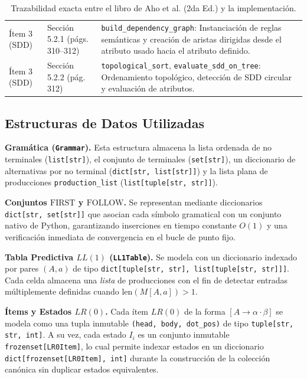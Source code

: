 \documentclass[11pt,a4paper]{article}
\begin{document}
\begin{table}[htbp]
\begin{tabular}{@{}>{\raggedright\arraybackslash}p{1.8cm}>{\raggedright\arraybackslash}p{4.3cm}>{\raggedright\arraybackslash}p{9.2cm}@{}}
\addlinespace[3pt]
\'Item 3 (SDD) & Secci\'on 5.2.1 (p\'ags. 310--312) & \texttt{build\_dependency\_graph}: Instanciaci\'on de reglas sem\'anticas y creaci\'on de aristas dirigidas desde el atributo usado hacia el atributo definido. \\
\addlinespace[3pt]
\'Item 3 (SDD) & Secci\'on 5.2.2 (p\'ag. 312) & \texttt{topological\_sort}, \texttt{evaluate\_sdd\_on\_tree}: Ordenamiento topol\'ogico, detecci\'on de SDD circular y evaluaci\'on de atributos. \\
\bottomrule
\end{tabular}
\caption{Trazabilidad exacta entre el libro de Aho et al. (2da Ed.) y la implementaci\'on.}
\label{tab:trazabilidad}
\end{table}

\subsection{Estructuras de Datos Utilizadas}

\textbf{Gram\'atica (\texttt{Grammar}).} Esta estructura almacena la lista ordenada de no terminales (\texttt{list[str]}), el conjunto de terminales (\texttt{set[str]}), un diccionario de alternativas por no terminal (\texttt{dict[str, list[str]]}) y la lista plana de producciones \texttt{production\_list} (\texttt{list[tuple[str, str]]}).

\textbf{Conjuntos $\text{FIRST}$ y $\text{FOLLOW}$.} Se representan mediante diccionarios \texttt{dict[str, set[str]]} que asocian cada s\'imbolo gramatical con un conjunto nativo de Python, garantizando inserciones en tiempo constante $O(1)$ y una verificaci\'on inmediata de convergencia en el bucle de punto fijo.

\textbf{Tabla Predictiva $LL(1)$ (\texttt{LL1Table}).} Se modela con un diccionario indexado por pares $(A, a)$ de tipo \texttt{dict[tuple[str, str], list[tuple[str, str]]]}. Cada celda almacena una \emph{lista} de producciones con el fin de detectar entradas m\'ultiplemente definidas cuando $\text{len}(M[A,a]) > 1$.

\textbf{\'Items y Estados $LR(0)$.} Cada \'item $LR(0)$ de la forma $[A \to \alpha \cdot \beta]$ se modela como una tupla inmutable \texttt{(head, body, dot\_pos)} de tipo \texttt{tuple[str, str, int]}. A su vez, cada estado $I_i$ es un conjunto inmutable \texttt{frozenset[LR0Item]}, lo cual permite indexar estados en un diccionario \texttt{dict[frozenset[LR0Item], int]} durante la construcci\'on de la colecci\'on can\'onica sin duplicar estados equivalentes.
\end{document}

